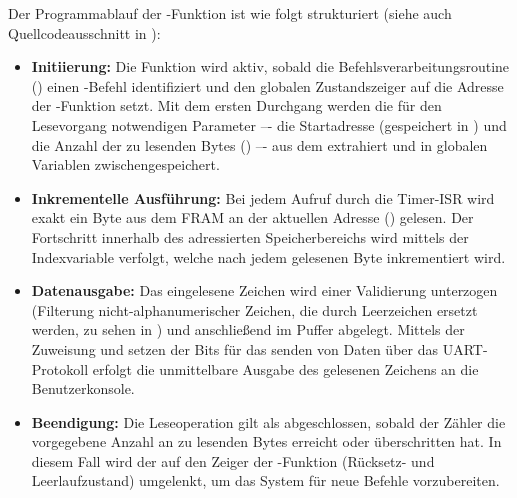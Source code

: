 Der Programmablauf der -Funktion ist wie folgt strukturiert (siehe auch Quellcodeausschnitt in ):
\begin{itemize}
	\item \textbf{Initiierung:} Die Funktion wird aktiv, sobald die Befehlsverarbeitungsroutine () einen \glqq{}\grqq{}-Befehl identifiziert und den globalen Zustandszeiger  auf die Adresse der -Funktion setzt. Mit dem ersten Durchgang werden die f\"ur den Lesevorgang notwendigen Parameter –- die Startadresse (gespeichert in ) und die Anzahl der zu lesenden Bytes () –- aus dem  extrahiert und in globalen Variablen zwischengespeichert.
	
	\item \textbf{Inkrementelle Ausf\"uhrung:} Bei jedem Aufruf durch die Timer-ISR wird exakt ein Byte aus dem FRAM an der aktuellen Adresse () gelesen. Der Fortschritt innerhalb des adressierten Speicherbereichs wird mittels der Indexvariable  verfolgt, welche nach jedem gelesenen Byte inkrementiert wird.
	
	\item \textbf{Datenausgabe:} Das eingelesene Zeichen wird einer Validierung unterzogen (Filterung nicht-alphanumerischer Zeichen, die durch Leerzeichen ersetzt werden, zu sehen in ) und anschlie{\ss}end im Puffer  abgelegt. Mittels der Zuweisung \glqq{}\grqq{} und setzen der Bits f\"ur das senden von Daten \"uber das UART-Protokoll erfolgt die unmittelbare Ausgabe des gelesenen Zeichens an die Benutzerkonsole.
	
	\item \textbf{Beendigung:} Die Leseoperation gilt als abgeschlossen, sobald der Z\"ahler  die vorgegebene Anzahl an zu lesenden Bytes erreicht oder \"uberschritten hat. In diesem Fall wird der  auf den Zeiger der -Funktion (R\"ucksetz- und Leerlaufzustand) umgelenkt, um das System f\"ur neue Befehle vorzubereiten.
\end{itemize}

